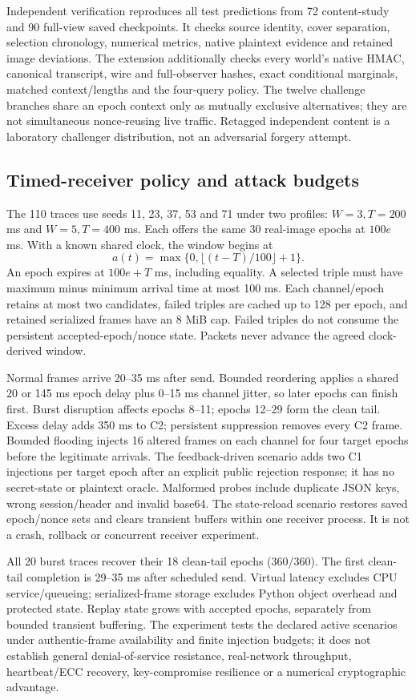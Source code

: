 \documentclass[journal]{IEEEtran}
\theoremstyle{definition}
\theoremstyle{game}
\begin{document}
Independent verification reproduces all test predictions from 72
content-study and 90 full-view saved checkpoints. It checks source
identity, cover separation, selection chronology, numerical metrics,
native plaintext evidence and retained image deviations. The extension
additionally checks every world's native HMAC, canonical transcript,
wire and full-observer hashes, exact conditional marginals, matched
context/lengths and the four-query policy. The twelve challenge branches
share an epoch context only as mutually exclusive alternatives; they
are not simultaneous nonce-reusing live traffic. Retagged independent
content is a laboratory challenger distribution, not an adversarial
forgery attempt.

\subsection{Timed-receiver policy and attack budgets}
The 110 traces use seeds 11, 23, 37, 53 and 71 under two profiles:
$W=3,T=200$ ms and $W=5,T=400$ ms. Each offers the same 30 real-image
epochs at $100e$ ms. With a known shared clock, the window begins at
\[
 a(t)=\max\{0,\lfloor(t-T)/100\rfloor+1\}.
\]
An epoch expires at $100e+T$ ms, including equality. A selected triple
must have maximum minus minimum arrival time at most 100 ms. Each
channel/epoch retains at most two candidates, failed triples are cached
up to 128 per epoch, and retained serialized frames have an 8 MiB cap.
Failed triples do not consume the persistent accepted-epoch/nonce state.
Packets never advance the agreed clock-derived window.

Normal frames arrive 20--35 ms after send. Bounded reordering applies
a shared 20 or 145 ms epoch delay plus 0--15 ms channel jitter, so later
epochs can finish first. Burst disruption affects epochs 8--11;
epochs 12--29 form the clean tail. Excess delay adds 350 ms to C2;
persistent suppression removes every C2 frame. Bounded flooding injects
16 altered frames on each channel for four target epochs before the
legitimate arrivals. The feedback-driven scenario adds two C1 injections
per target epoch after an explicit public rejection response; it has
no secret-state or plaintext oracle. Malformed probes include duplicate
JSON keys, wrong session/header and invalid base64. The state-reload
scenario restores saved epoch/nonce sets and clears transient buffers
within one receiver process. It is not a crash, rollback or concurrent
receiver experiment.

All 20 burst traces recover their 18 clean-tail epochs (360/360).
The first clean-tail completion is 29--35 ms after scheduled send.
Virtual latency excludes CPU service/queueing; serialized-frame storage
excludes Python object overhead and protected state. Replay state grows
with accepted epochs, separately from bounded transient buffering.
The experiment tests the declared active scenarios under authentic-frame
availability and finite injection budgets; it does not establish
general denial-of-service resistance, real-network throughput,
heartbeat/ECC recovery, key-compromise resilience or a numerical
cryptographic advantage.
\end{document}
